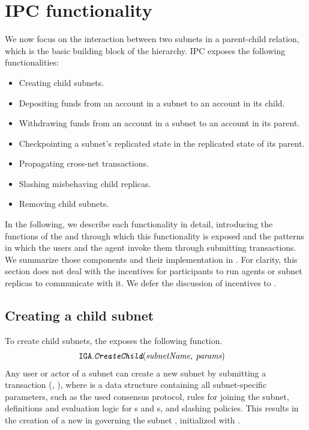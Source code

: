 \section{IPC functionality}
\label{sec:functionality}

We now focus on the interaction between two subnets in a parent-child relation, which is the basic building block of the \ipc hierarchy.
IPC exposes the following functionalities:
\begin{itemize}
    \item Creating child subnets.
    \item Depositing funds from an account in a subnet to an account in its child.
    \item Withdrawing funds from an account in a subnet to an account in its parent.
    \item Checkpointing a subnet's replicated state in the replicated state of its parent.
    \item Propagating cross-net transactions.
    \item Slashing misbehaving child replicas.
    \item Removing child subnets.
\end{itemize}
In the following, we describe each functionality in detail, introducing the functions of the \gw and \sa through which this functionality is exposed
and the patterns in which the users and the \ipc agent invoke them through submitting transactions.
We summarize those components and their implementation in .
For clarity, this section does not deal with the incentives for participants to run \ipc agents or subnet replicas to communicate with it.
We defer the discussion of incentives to .

\subsection{Creating a child subnet}
\label{sec:create}

To create child subnets, the \gw exposes the following function.
\begin{align*}
    \texttt{IGA}.&\textit{\texttt{CreateChild}}(\textit{subnetName, params})    
\end{align*}
Any user or actor of a subnet  can create a new subnet  by submitting a transaction (, ),
where  is a data structure containing all subnet-specific parameters,
such as the used consensus protocol, rules for joining the subnet, definitions and evaluation logic for {\pom}s and {\pof}s, and slashing policies.
This results in the creation of a new \saFull \sa in  governing the subnet , initialized with .

